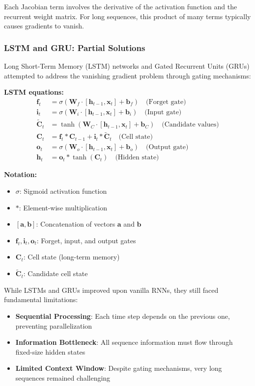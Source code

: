 \documentclass[11pt]{article}
\begin{document}
Each Jacobian term involves the derivative of the activation function and the recurrent weight matrix. For long sequences, this product of many terms typically causes gradients to vanish.

\subsubsection{LSTM and GRU: Partial Solutions}

Long Short-Term Memory (LSTM) networks and Gated Recurrent Units (GRUs) attempted to address the vanishing gradient problem through gating mechanisms:

\textbf{LSTM equations:}
\begin{align}
\mathbf{f}_t &= \sigma(\mathbf{W}_f \cdot [\mathbf{h}_{t-1}, \mathbf{x}_t] + \mathbf{b}_f) \quad \text{(Forget gate)} \\
\mathbf{i}_t &= \sigma(\mathbf{W}_i \cdot [\mathbf{h}_{t-1}, \mathbf{x}_t] + \mathbf{b}_i) \quad \text{(Input gate)} \\
\tilde{\mathbf{C}}_t &= \tanh(\mathbf{W}_C \cdot [\mathbf{h}_{t-1}, \mathbf{x}_t] + \mathbf{b}_C) \quad \text{(Candidate values)} \\
\mathbf{C}_t &= \mathbf{f}_t * \mathbf{C}_{t-1} + \mathbf{i}_t * \tilde{\mathbf{C}}_t \quad \text{(Cell state)} \\
\mathbf{o}_t &= \sigma(\mathbf{W}_o \cdot [\mathbf{h}_{t-1}, \mathbf{x}_t] + \mathbf{b}_o) \quad \text{(Output gate)} \\
\mathbf{h}_t &= \mathbf{o}_t * \tanh(\mathbf{C}_t) \quad \text{(Hidden state)}
\end{align}
\begin{notationbox}
\textbf{Notation:}
\begin{itemize}
    \item $\sigma$: Sigmoid activation function
    \item $*$: Element-wise multiplication
    \item $[\mathbf{a}, \mathbf{b}]$: Concatenation of vectors $\mathbf{a}$ and $\mathbf{b}$
    \item $\mathbf{f}_t, \mathbf{i}_t, \mathbf{o}_t$: Forget, input, and output gates
    \item $\mathbf{C}_t$: Cell state (long-term memory)
    \item $\tilde{\mathbf{C}}_t$: Candidate cell state
\end{itemize}
\end{notationbox}

While LSTMs and GRUs improved upon vanilla RNNs, they still faced fundamental limitations:
\begin{itemize}
    \item \textbf{Sequential Processing}: Each time step depends on the previous one, preventing parallelization
    \item \textbf{Information Bottleneck}: All sequence information must flow through fixed-size hidden states
    \item \textbf{Limited Context Window}: Despite gating mechanisms, very long sequences remained challenging
\end{itemize}
\end{document}
